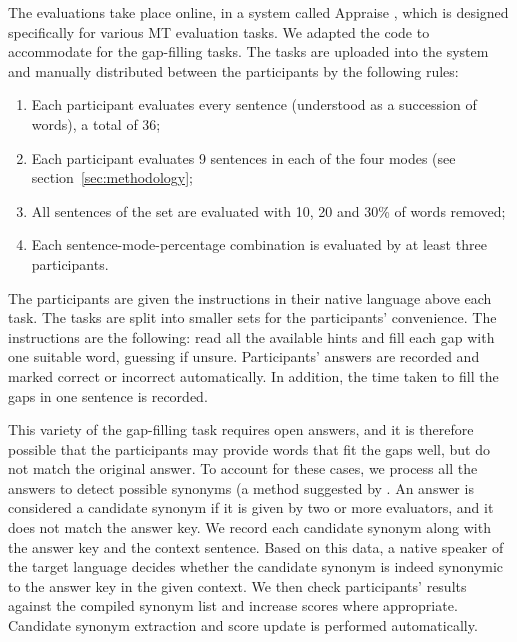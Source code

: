 \documentclass[11pt]{article}
\newcommand{\comment}[1]{\marginpar{\scriptsize\sf \textcolor{blue}{#1}}}
\begin{document}
The evaluations take place online, in a system called Appraise \citep{federmann12}, which is designed specifically for various MT
evaluation tasks. We adapted the code to accommodate for the gap-filling tasks. The
tasks are uploaded into the system and manually distributed between the participants by
the following rules:
\begin{enumerate}
\item  Each participant evaluates every sentence (understood as a succession of words),
a total of 36;
\item  Each participant evaluates 9 sentences in each of the four modes (see section~\ref{sec:methodology};
\item  All sentences of the set are evaluated with 10, 20 and 30\% of words removed;
\item  Each sentence-mode-percentage combination is evaluated by at least three participants.
\end{enumerate}
The participants are given the instructions in their native language above each task. The
tasks are split into smaller sets for the participants' convenience. The instructions are the following: read all the available hints and fill each gap with one suitable word, guessing if unsure.
Participants' answers are recorded and marked correct or incorrect automatically. In
addition, the time taken to fill the gaps in one sentence is recorded.

This variety of the gap-filling task requires open answers, and it is therefore possible that the participants may
provide words that fit the gaps well, but do not match the original answer. To account for
these cases, we process all the answers to detect possible synonyms (a method suggested by \citet{oregan13}. An answer is
considered a candidate synonym if it is given by two or more evaluators, and it does not match
the answer key. We record each candidate synonym along with the answer key and the
context sentence. Based on this data, a native speaker of the target language decides
whether the candidate synonym is indeed synonymic to the answer key in the given
context. We then check participants' results against the compiled synonym list and
increase scores where appropriate. Candidate synonym extraction and score update is performed automatically.
\comment{FMT: How long did making the synonym list take, how many synonyms were added? More details here.}

\comment{EA: the sections below are from the report and have not been edited yet.}
\end{document}
